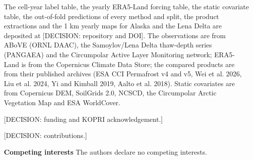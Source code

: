 \ifnum{}
The cell-year label table, the yearly ERA5-Land forcing table, the static covariate table, the out-of-fold predictions of every method and split, the product extractions and the 1 km yearly maps for Alaska and the Lena Delta are deposited at [DECISION: repository and DOI]. The observations are from ABoVE (ORNL DAAC), the Samoylov/Lena Delta thaw-depth series (PANGAEA) and the Circumpolar Active Layer Monitoring network; ERA5-Land is from the Copernicus Climate Data Store; the compared products are from their published archives (ESA CCI Permafrost v4 and v5, Wei et al. 2026, Liu et al. 2024, Yi and Kimball 2019, Aalto et al. 2018). Static covariates are from Copernicus DEM, SoilGrids 2.0, NCSCD, the Circumpolar Arctic Vegetation Map and ESA WorldCover.
\fi

\ifnum{}
[DECISION: funding and KOPRI acknowledgement.]

[DECISION: contributions.]

\textbf{Competing interests} The authors declare no competing interests.
\fi
